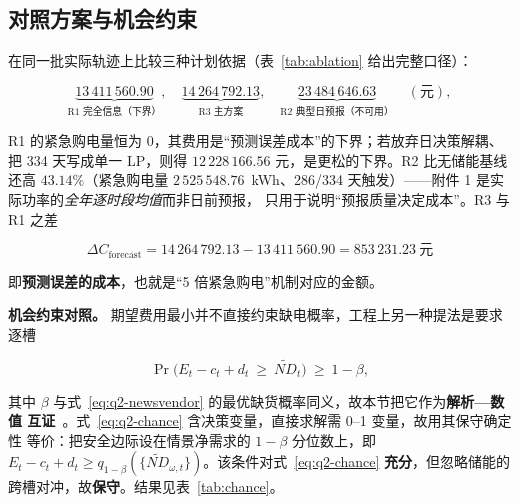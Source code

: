 \subsection{对照方案与机会约束}\label{sec:q2-compare}\label{sec:q2-chance}

在同一批实际轨迹上比较三种计划依据（表~\ref{tab:ablation} 给出完整口径）：

\begin{equation}
  \underbrace{13\,411\,560.90}_{\text{R1 完全信息（下界）}},\quad
  \underbrace{14\,264\,792.13}_{\text{R3 主方案}},\quad
  \underbrace{23\,484\,646.63}_{\text{R2 典型日预报（不可用）}}\quad(\text{元}),
  \label{eq:q2-compare}
\end{equation}

R1 的紧急购电量恒为 0，其费用是“预测误差成本”的下界；若放弃日决策解耦、把 334 天写成单一
LP，则得 \(12\,228\,166.56\) 元，是更松的下界。R2 比无储能基线还高 \(43.14\%\)（紧急购电量
\(2\,525\,548.76\)~kWh、286/334 天触发）——附件 1 是实际功率的\emph{全年逐时段均值}而非日前预报，
只用于说明“预报质量决定成本”。R3 与 R1 之差

\begin{equation}
  \Delta C_{\text{forecast}}=14\,264\,792.13-13\,411\,560.90=853\,231.23\ \text{元}
  \label{eq:q2-forecasterr}
\end{equation}

即\textbf{预测误差的成本}，也就是“5 倍紧急购电”机制对应的金额。

\textbf{机会约束对照。} 期望费用最小并不直接约束缺电概率，工程上另一种提法是要求逐槽

\begin{equation}
  \Pr\bigl(E_t-c_t+d_t\ \ge\ \widetilde{ND}_t\bigr)\ \ge\ 1-\beta ,
  \label{eq:q2-chance}
\end{equation}

其中 \(\beta\) 与式~\eqref{eq:q2-newsvendor} 的最优缺货概率同义，故本节把它作为\textbf{解析—数值
互证}~\cite{refzhangzt}。式~\eqref{eq:q2-chance} 含决策变量，直接求解需 0--1 变量，故用其保守确定性
等价：把安全边际设在情景净需求的 \(1-\beta\) 分位数上，即
\(E_t-c_t+d_t\ge q_{1-\beta}(\{\widetilde{ND}_{\omega,t}\})\)。该条件对式~\eqref{eq:q2-chance}
\textbf{充分}，但忽略储能的跨槽对冲，故\textbf{保守}。结果见表~\ref{tab:chance}。

